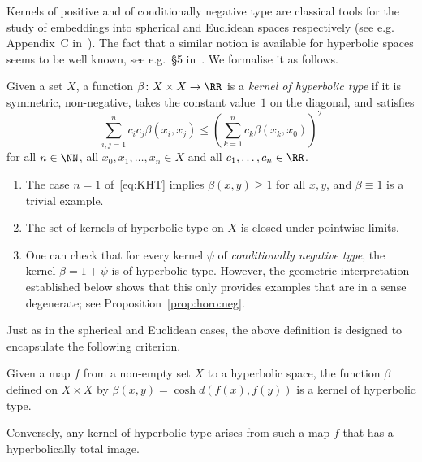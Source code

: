 Kernels of positive and of conditionally negative type are classical tools for the study of embeddings into spherical and Euclidean spaces respectively (see e.g. Appendix~C in~\cite{Bekka-Harpe-Valette}). The fact that a similar notion is available for hyperbolic spaces seems to be well known, see e.g.~\S5 in~\cite{Gromov_conc}. We formalise it as follows.

\begin{defi}\label{def:KHT}
Given a set $X$, a function $\beta\colon X\times X\to\RR$ is a \emph{kernel of hyperbolic type} if it is symmetric, non-negative, takes the constant value~$1$ on the diagonal, and satisfies
\begin{equation}\label{eq:KHT}
\sum_{i,j=1}^n c_i c_j \beta(x_i, x_j) \leq \left(\sum_{k=1}^n c_k \beta(x_k, x_0)\right)^2
\end{equation}
for all $n\in \NN$, all $x_0, x_1, \ldots, x_n\in X$ and all $c_1, \ldots, c_n\in \RR$.
\end{defi}

\begin{remas}\label{rems:KHT}
\begin{enumerate}\romanenumi
\item The case $n=1$ of~\eqref{eq:KHT} implies $\beta(x,y)\geq 1$ for all $x,y$, and $\beta\equiv 1$ is a trivial example.

\item The set of kernels of hyperbolic type on $X$ is closed under pointwise limits.

\item One can check that for every kernel $\psi$ of \emph{conditionally negative type}, the kernel $\beta=1+\psi$ is of hyperbolic type. However, the geometric interpretation established below shows that this only provides examples that are in a sense degenerate; see Proposition~\ref{prop:horo:neg}.
\end{enumerate}
\end{remas}

Just as in the spherical and Euclidean cases, the above definition is designed to encapsulate the following criterion.

\begin{prop}\label{prop:KHT}
Given a map $f$ from a non-empty set $X$ to a hyperbolic space, the function $\beta$ defined on $X\times X$ by $\beta(x,y)=\cosh d(f(x),f(y))$ is a kernel of hyperbolic type.

Conversely, any kernel of hyperbolic type arises from such a map $f$ that has a hyperbolically total image.
\end{prop}

